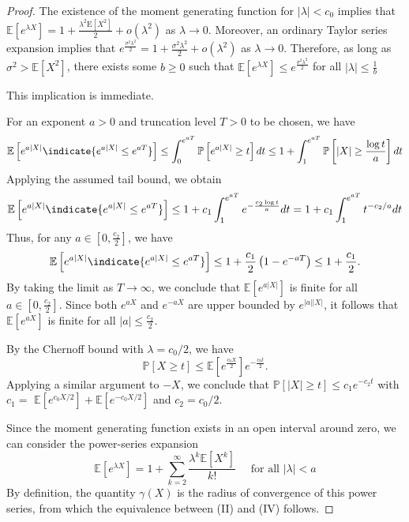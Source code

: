 \documentclass{article}
\begin{document}
\begin{proof}
 The existence of the moment generating function for $|\lambda|<c_{0}$ implies that $\mathbb{E}\left[e^{\lambda X}\right]=1+\frac{\lambda^{2} \mathrm{E}\left[X^{2}\right]}{2}+o\left(\lambda^{2}\right)$ as $\lambda \rightarrow 0 .$ Moreover, an ordinary Taylor series expansion
implies that $e^{\frac{\sigma^{2} \lambda^{2}}{2}}=1+\frac{\sigma^{2} \lambda^{2}}{2}+o\left(\lambda^{2}\right)$ as $\lambda \rightarrow 0$. Therefore, as long as $\sigma^{2}>\mathbb{E}\left[X^{2}\right]$, there
exists some $b \geq 0$ such that $\mathbb{E}\left[e^{\lambda X}\right] \leq e^{\frac{\sigma^{2} \lambda^{2}}{2}}$ for all $|\lambda| \leq \frac{1}{b}$

 This implication is immediate.

 For an exponent $a>0$ and truncation level $T>0$ to be chosen, we have
$$
\mathbb{E}\left[e^{a|X|} \indicate{e^{a|X|} \leq e^{a T}}\right] \leq \int_{0}^{e^{a T}} \mathbb{P}\left[e^{a|X|} \geq t\right] d t \leq 1+\int_{1}^{e^{a T}} \mathbb{P}\left[|X| \geq \frac{\log t}{a}\right] d t
$$
Applying the assumed tail bound, we obtain
$$
\mathbb{E}\left[e^{a|X|} \indicate{e^{a|X|} \leq e^{a T}}\right]  \leq 1+c_{1} \int_{1}^{e^{a T}} e^{-\frac{c_{2} \log t}{a}} d t=1+c_{1} \int_{1}^{e^{a T}} t^{-c_{2} / a} d t
$$
Thus, for any $a \in\left[0, \frac{c_{2}}{2}\right]$, we have
$$
\mathbb{E}\left[e^{a|X|} \indicate{e^{a|X|} \leq e^{a T}}\right]  \leq 1+\frac{c_{1}}{2}\left(1-e^{-a T}\right) \leq 1+\frac{c_{1}}{2} .
$$
By taking the limit as $T \rightarrow \infty$, we conclude that $\mathbb{E}\left[e^{a|X|}\right]$ is finite for all $a \in\left[0, \frac{c_{2}}{2}\right]$. Since both $e^{a X}$ and $e^{-a X}$ are upper bounded by $e^{|a||X|}$, it follows that $\mathbb{E}\left[e^{a X}\right]$ is finite for all $|a| \leq \frac{c_{2}}{2}$.

 By the Chernoff bound with $\lambda=c_{0} / 2$, we have
$$
\mathbb{P}[X \geq t] \leq \mathbb{E}\left[e^{\frac{c_{0} X}{2}}\right] e^{-\frac{c_{0} t}{2}} .
$$
Applying a similar argument to $-X$, we conclude that $\mathbb{P}[|X| \geq t] \leq c_{1} e^{-c_{2} t}$ with $c_{1}=$ $\mathbb{E}\left[e^{c_{0} X / 2}\right]+\mathbb{E}\left[e^{-c_{0} X / 2}\right]$ and $c_{2}=c_{0} / 2$.

 Since the moment generating function exists in an open interval around zero, we can consider the power-series expansion
$$
\mathbb{E}\left[e^{\lambda X}\right]=1+\sum_{k=2}^{\infty} \frac{\lambda^{k} \mathbb{E}\left[X^{k}\right]}{k !} \quad \text { for all }|\lambda|<a
$$
By definition, the quantity $\gamma(X)$ is the radius of convergence of this power series, from which the equivalence between (II) and (IV) follows.
\end{proof}
\end{document}
